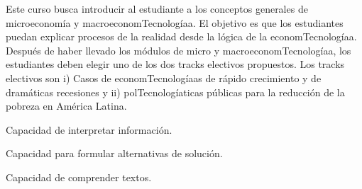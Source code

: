 \begin{syllabus}


\begin{justification}
Este curso busca introducir al estudiante a los conceptos generales de microeconomía y macroeconomTecnologíaa. El objetivo es que los estudiantes puedan explicar procesos de la realidad desde la lógica de la economTecnologíaa. Después de haber llevado los módulos de micro y macroeconomTecnologíaa, los estudiantes deben elegir uno de los dos tracks electivos propuestos.
Los tracks electivos son i) Casos de economTecnologíaas de rápido crecimiento y de dramáticas recesiones y ii) polTecnologíaticas públicas para la reducción de la pobreza en América Latina.
\end{justification}

\begin{goals}
\item Capacidad de interpretar información.
\item Capacidad para formular alternativas de solución.
\item Capacidad de comprender textos.
\end{goals}

\begin{outcomes}
    \item {} %
    \item {} %
    \item {} %
    \item {} %

\end{outcomes}

\begin{competences}
    \item {}
    \item {}
    \item {}
    \item {}
\end{competences}


\end{syllabus}
